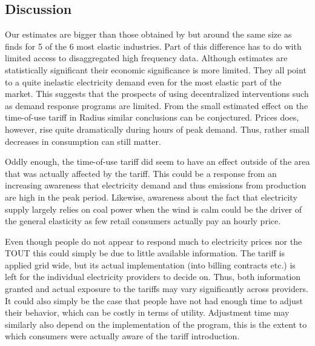 \subsection{Discussion}
\label{subsec:r_discussion}
Our estimates are bigger than those obtained by \citet{lijesen2007real} but around the same size as \citet{wolak2001impact} finds for 5 of the 6 most elastic industries. Part of this difference has to do with limited access to disaggregated high frequency data. Although estimates are statistically significant their economic significance is more limited. They all point to a quite inelastic electricity demand even for the most elastic part of the market. This suggests that the prospects of using decentralized interventions such as demand response programs are limited. From the small estimated effect on the time-of-use tariff in Radius similar conclusions can be conjectured. Prices does, however, rise quite dramatically during hours of peak demand. Thus, rather small decreases in consumption can still matter. %
\bigskip

Oddly enough, the time-of-use tariff did seem to have an effect outside of the area that was actually affected by the tariff. This could be a response from an increasing awareness that electricity demand and thus emissions from production are high in the peak period. Likewise, awareness about the fact that electricity supply largely relies on coal power when the wind is calm could be the driver of the general elasticity as few retail consumers actually pay an hourly price.
\par
Even though people do not appear to respond much to electricity prices nor the TOUT this could simply be due to little available information. The tariff is applied grid wide, but its actual implementation (into billing contracts etc.) is left for the individual electricity providers to decide on. Thus, both information granted and actual exposure to the tariffs may vary significantly across providers. It could also simply be the case that people have not had enough time to adjust their behavior, which can be costly in terms of utility. Adjustment time may similarly also depend on the implementation of the program, this is the extent to which consumers were actually aware of the tariff introduction.
\bigskip

